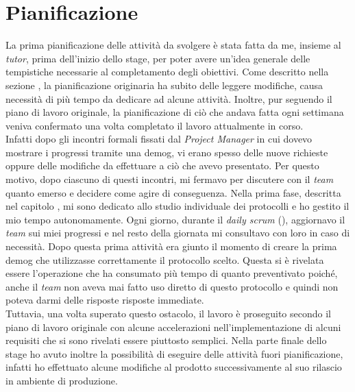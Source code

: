 \section{Pianificazione}
La prima pianificazione delle attività da svolgere è stata fatta da me, insieme al \textit{tutor}, prima dell'inizio dello stage, per poter avere un'idea generale delle tempistiche necessarie al completamento degli obiettivi. Come descritto nella sezione , la pianificazione originaria ha subito delle leggere modifiche, causa necessità di più tempo da dedicare ad alcune attività. Inoltre, pur seguendo il piano di lavoro originale, la pianificazione di ciò che andava fatta ogni settimana veniva confermato una volta completato il lavoro attualmente in corso.\\
Infatti dopo gli incontri formali fissati dal \textit{Project Manager} in cui dovevo mostrare i progressi tramite una \gls{demog}, vi erano spesso delle nuove richieste oppure delle modifiche da effettuare a ciò che avevo presentato. Per questo motivo, dopo ciascuno di questi incontri, mi fermavo per discutere con il \textit{team} quanto emerso e decidere come agire di conseguenza. Nella prima fase, descritta nel capitolo , mi sono dedicato allo studio individuale dei protocolli e ho gestito il mio tempo autonomamente. Ogni giorno, durante il \textit{daily scrum} (), aggiornavo il \textit{team} sui miei progressi e nel resto della giornata mi consultavo con loro in caso di necessità. Dopo questa prima attività era giunto il momento di creare la prima \gls{demog} che utilizzasse correttamente il protocollo scelto. Questa si è rivelata essere l'operazione che ha consumato più tempo di quanto preventivato poiché, anche il \textit{team} non aveva mai fatto uso diretto di questo protocollo e quindi non poteva darmi delle risposte risposte immediate.\\
Tuttavia, una volta superato questo ostacolo, il lavoro è proseguito secondo il piano di lavoro originale con alcune accelerazioni nell'implementazione di alcuni requisiti che si sono rivelati essere piuttosto semplici. Nella parte finale dello stage ho avuto inoltre la possibilità di eseguire delle attività fuori pianificazione, infatti ho effettuato alcune modifiche al prodotto successivamente al suo rilascio in ambiente di produzione.


